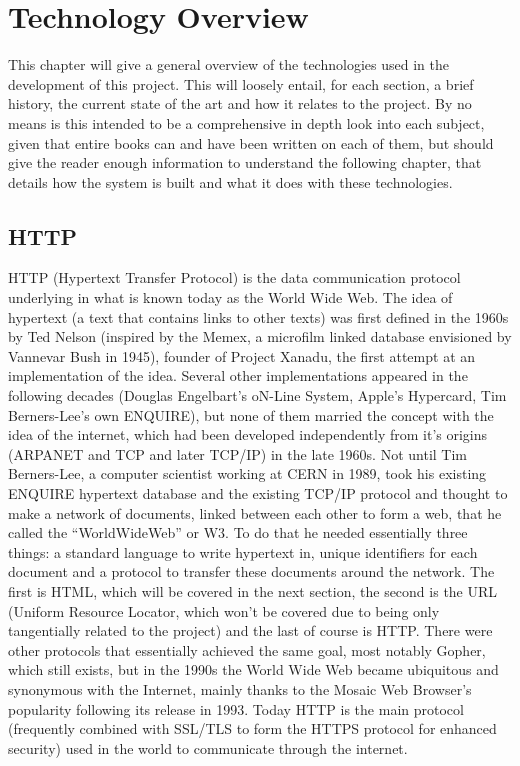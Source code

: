 \chapter{Technology Overview}
This chapter will give a general overview of the technologies used in the development of this project. 
This will loosely entail, for each section, a brief history, the current state of the art and how it relates 
to the project. By no means is this intended to be a comprehensive in depth look into each subject, given that 
entire books can and have been written on each of them, but should give the reader enough information to understand 
the following chapter, that details how the system is built and what it does with these technologies.
\section{HTTP}

HTTP (Hypertext Transfer Protocol) is the data communication protocol underlying in what is known today as the World Wide Web. The idea of hypertext (a text that contains links to other texts) was first defined in the 1960s by Ted Nelson (inspired by the Memex, a microfilm linked database envisioned by Vannevar Bush in 1945), founder of Project Xanadu, the first attempt at an implementation of the idea. Several other implementations appeared in the following decades (Douglas Engelbart's oN-Line System, Apple's Hypercard, Tim Berners-Lee's own ENQUIRE), but none of them married the concept with the idea of the internet, which had been developed independently from it's origins (ARPANET and TCP and later TCP/IP) in the late 1960s. Not until Tim Berners-Lee, a computer scientist working at CERN in 1989, took his existing ENQUIRE hypertext database and the existing TCP/IP protocol and thought to make a network of documents, linked between each other to form a web, that he called the ``WorldWideWeb'' or W3. To do that he needed essentially three things: a standard language to write hypertext in, unique identifiers for each document and a protocol to transfer these documents around the network. The first is HTML, which will be covered in the next section, the second is the URL (Uniform Resource Locator, which won't be covered due to being only tangentially related to the project) and the last of course is HTTP. There were other protocols that essentially achieved the same goal, most notably Gopher, which still exists, but in the 1990s the World Wide Web became ubiquitous and synonymous with the Internet, mainly thanks to the Mosaic Web Browser's popularity following its release in 1993. Today HTTP is the main protocol (frequently combined with SSL/TLS to form the HTTPS protocol for enhanced security) used in the world to communicate through the internet.\\

